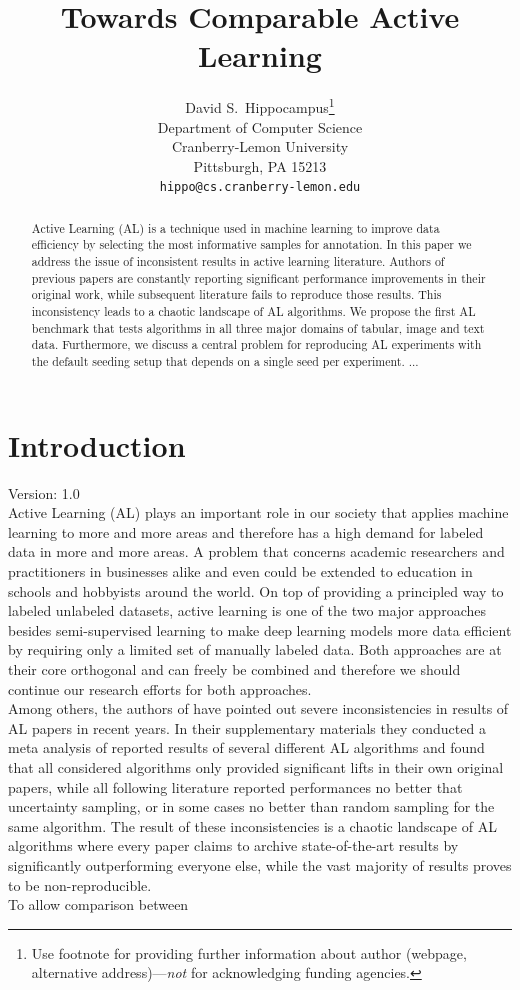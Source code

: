 \documentclass[]{article}
\title{Towards Comparable Active Learning}
\author{%
	David S.~Hippocampus\thanks{Use footnote for providing further information
		about author (webpage, alternative address)---\emph{not} for acknowledging
		funding agencies.} \\
	Department of Computer Science\\
	Cranberry-Lemon University\\
	Pittsburgh, PA 15213 \\
	\texttt{hippo@cs.cranberry-lemon.edu} \\
}
\begin{document}
\maketitle

\begin{abstract}
	Active Learning (AL) is a technique used in machine learning to improve data efficiency by selecting the most informative samples for annotation. 
	In this paper we address the issue of inconsistent results in active learning literature.
	Authors of previous papers are constantly reporting significant performance improvements in their original work, while subsequent literature fails to reproduce those results. This inconsistency leads to a chaotic landscape of AL algorithms.
	We propose the first AL benchmark that tests algorithms in all three major domains of tabular, image and text data.
	Furthermore, we discuss a central problem for reproducing AL experiments with the default seeding setup that depends on a single seed per experiment.
	...
\end{abstract}

\section{Introduction}
{\color{red} Version: 1.0}\\
Active Learning (AL) plays an important role in our society that applies machine learning to more and more areas and therefore has a high demand for labeled data in more and more areas.
A problem that concerns academic researchers and practitioners in businesses alike and even could be extended to education in schools and hobbyists around the world.
On top of providing a principled way to labeled unlabeled datasets, active learning is one of the two major approaches besides semi-supervised learning to make deep learning models more data efficient by requiring only a limited set of manually labeled data.
Both approaches are at their core orthogonal and can freely be combined and therefore we should continue our research efforts for both approaches. \\
Among others, the authors of \cite{zhou2021towards} have pointed out severe inconsistencies in results of AL papers in recent years. 
In their supplementary materials they conducted a meta analysis of reported results of several different AL algorithms and found that all considered algorithms only provided significant lifts in their own original papers, while all following literature reported performances no better that uncertainty sampling, or in some cases no better than random sampling for the same algorithm.
The result of these inconsistencies is a chaotic landscape of AL algorithms where every paper claims to archive state-of-the-art results by significantly outperforming everyone else, while the vast majority of results proves to be non-reproducible. \\ [1mm]
%
To allow comparison between 
\end{document}
